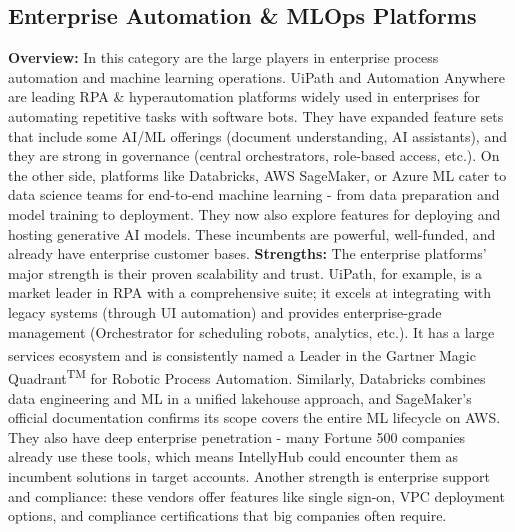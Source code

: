 \documentclass[11pt, a4paper, oneside]{article}
\begin{document}
\subsection{Enterprise Automation \& MLOps Platforms}
\textbf{Overview:} In this category are the large players in enterprise process automation and machine learning operations. UiPath and Automation Anywhere are leading RPA \& hyperautomation platforms widely used in enterprises for automating repetitive tasks with software bots. They have expanded feature sets that include some AI/ML offerings (document understanding, AI assistants), and they are strong in governance (central orchestrators, role-based access, etc.). On the other side, platforms like Databricks, AWS SageMaker, or Azure ML cater to data science teams for end-to-end machine learning - from data preparation and model training to deployment. They now also explore features for deploying and hosting generative AI models. These incumbents are powerful, well-funded, and already have enterprise customer bases.
\newline\newline
\textbf{Strengths:} The enterprise platforms' major strength is their proven scalability and trust. UiPath, for example, is a market leader in RPA with a comprehensive suite; it excels at integrating with legacy systems (through UI automation) and provides enterprise-grade management (Orchestrator for scheduling robots, analytics, etc.). It has a large services ecosystem and is consistently named a Leader in the Gartner\textsuperscript{\textregistered} Magic Quadrant\textsuperscript{TM} for Robotic Process Automation\cite{uipathGartner}. Similarly, Databricks combines data engineering and ML in a unified lakehouse approach, and SageMaker's official documentation confirms its scope covers the entire ML lifecycle on AWS\cite{awsSagemaker}. They also have deep enterprise penetration - many Fortune 500 companies already use these tools, which means IntellyHub could encounter them as incumbent solutions in target accounts. Another strength is enterprise support and compliance: these vendors offer features like single sign-on, VPC deployment options, and compliance certifications that big companies often require.
\newline\newline
\end{document}
